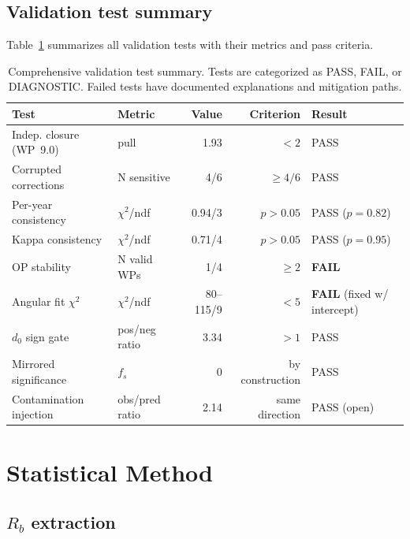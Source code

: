 \documentclass[11pt,a4paper]{article}
\begin{document}
\subsection{Validation test summary}
\label{sec:validation_summary}

Table~\ref{tab:validation_summary} summarizes all validation tests with their metrics
and pass criteria.

\begin{table}[htbp]
\centering
\caption{Comprehensive validation test summary. Tests are categorized as PASS, FAIL,
or DIAGNOSTIC. Failed tests have documented explanations and mitigation paths.}
\label{tab:validation_summary}
\small
\begin{tabular}{llrrl}
\toprule
Test & Metric & Value & Criterion & Result \\
\midrule
Indep. closure (WP~9.0) & pull & 1.93 & $< 2$ & PASS \\
Corrupted corrections & N sensitive & 4/6 & $\geq 4/6$ & PASS \\
Per-year consistency & $\chi^2$/ndf & 0.94/3 & $p > 0.05$ & PASS ($p = 0.82$) \\
Kappa consistency & $\chi^2$/ndf & 0.71/4 & $p > 0.05$ & PASS ($p = 0.95$) \\
OP stability & N valid WPs & 1/4 & $\geq 2$ & \textbf{FAIL} \\
Angular fit $\chi^2$ & $\chi^2$/ndf & 80--115/9 & $< 5$ & \textbf{FAIL} (fixed w/ intercept) \\
$d_0$ sign gate & pos/neg ratio & 3.34 & $> 1$ & PASS \\
Mirrored significance & $f_s$ & 0 & by construction & PASS \\
Contamination injection & obs/pred ratio & 2.14 & same direction & PASS (open) \\
\bottomrule
\end{tabular}
\end{table}

\FloatBarrier
{}
\section{Statistical Method}
\label{sec:statmethod}

\subsection{$R_b$ extraction}
\label{sec:stat_rb}
\end{document}
